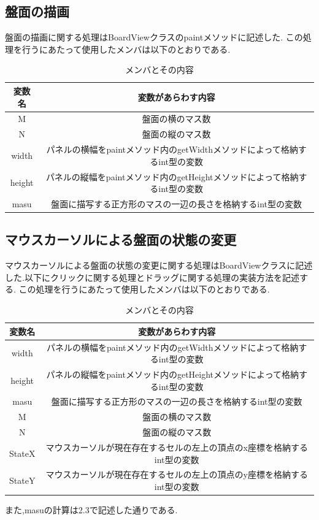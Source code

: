 \documentclass[dvipdfmx]{jarticle}
\begin{document}
\subsection{盤面の描画}

盤面の描画に関する処理はBoardViewクラスのpaintメソッドに記述した.
この処理を行うにあたって使用したメンバは以下のとおりである.
\begin{table}[h]
  \centering
  \begin{tabular}{|c||c|}
    \hline
    変数名 & 変数があらわす内容\\
    \hline\hline
    M & 盤面の横のマス数\\\hline
    N & 盤面の縦のマス数\\\hline
    width & パネルの横幅をpaintメソッド内のgetWidthメソッドによって格納するint型の変数 \\\hline
    height & パネルの縦幅をpaintメソッド内のgetHeightメソッドによって格納するint型の変数\\\hline
    masu & 盤面に描写する正方形のマスの一辺の長さを格納するint型の変数\\\hline

  \end{tabular}
  \caption{メンバとその内容}
\end{table}

\subsection{マウスカーソルによる盤面の状態の変更}

  マウスカーソルによる盤面の状態の変更に関する処理はBoardViewクラスに記述した.以下にクリックに関する処理とドラッグに関する処理の実装方法を記述する.
この処理を行うにあたって使用したメンバは以下のとおりである.

\begin{table}[h]
    \centering
    \begin{tabular}{|c||c|}
        \hline
        変数名 & 変数があらわす内容\\
        \hline\hline
        width & パネルの横幅をpaintメソッド内のgetWidthメソッドによって格納するint型の変数 \\\hline
        height & パネルの縦幅をpaintメソッド内のgetHeightメソッドによって格納するint型の変数\\\hline
        masu & 盤面に描写する正方形のマスの一辺の長さを格納するint型の変数\\\hline
        M & 盤面の横のマス数\\\hline
        N & 盤面の縦のマス数\\\hline
        StateX & マウスカーソルが現在存在するセルの左上の頂点のx座標を格納するint型の変数\\\hline
        StateY & マウスカーソルが現在存在するセルの左上の頂点のy座標を格納するint型の変数\\\hline
    \end{tabular}
    \caption{メンバとその内容}
\end{table}
また,masuの計算は2.3で記述した通りである.
\end{document}
